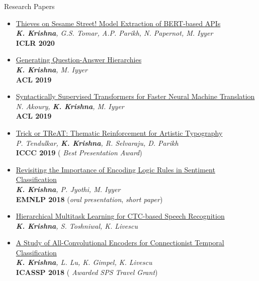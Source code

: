 \documentclass{resume} %
\begin{document}
\begin{rSection}{Research Papers}
\vspace*{0.1in}
\begin{itemize}[leftmargin=*]
\item \href{https://arxiv.org/abs/1910.12366}{Thieves on Sesame Street! Model Extraction of BERT-based APIs} \\ \textit{\textbf{K. Krishna}, G.S. Tomar, A.P. Parikh, N. Papernot, M. Iyyer} \\ \textbf{ICLR 2020}
\item \href{https://arxiv.org/abs/1906.02622}{Generating Question-Answer Hierarchies} \\ \textit{\textbf{K. Krishna}, M. Iyyer} \\ \textbf{ACL 2019}
\item \href{https://arxiv.org/abs/1906.02780}{Syntactically Supervised Transformers for Faster Neural Machine Translation} \\ \textit{N. Akoury, \textbf{K. Krishna}, M. Iyyer} \\ \textbf{ACL 2019}
\item \href{https://arxiv.org/abs/1903.07820}{Trick or TReAT: Thematic Reinforcement for Artistic Typography} \\ \textit{P. Tendulkar, \textbf{K. Krishna}, R. Selvaraju, D. Parikh} \\ \textbf{ICCC 2019} ({\color{red} \textit{Best Presentation Award}})
\item \href{https://arxiv.org/abs/1808.07733}{Revisiting the Importance of Encoding Logic Rules in Sentiment Classification} \\ \textit{\textbf{K. Krishna}, P. Jyothi, M. Iyyer} \\ \textbf{EMNLP 2018} ({\color{red}\textit{oral presentation}}, \textit{short paper})
\item \href{https://arxiv.org/abs/1807.06234}{Hierarchical Multitask Learning for CTC-based Speech Recognition} \\ \textit{\textbf{K. Krishna}, S. Toshniwal, K. Livescu}
\item \href{https://arxiv.org/abs/1710.10398}{A Study of All-Convolutional Encoders for Connectionist Temporal Classification}\\ \textit{\textbf{K. Krishna}, L. Lu, K. Gimpel,  K. Livescu}\\ \textbf{ICASSP 2018} ({\color{red} \textit{Awarded SPS Travel Grant}})
\end{itemize}
\end{rSection}
\end{document}
